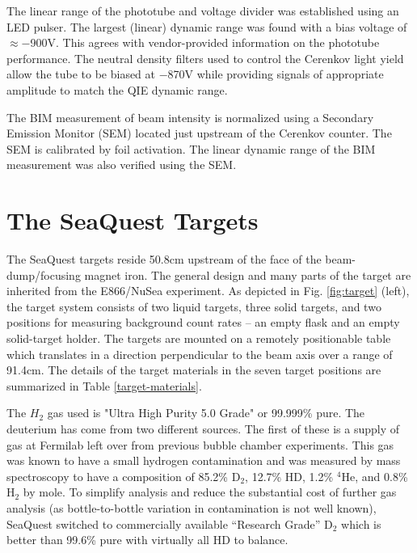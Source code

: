 The linear range of the phototube and voltage divider was established using an LED pulser.  The largest (linear) dynamic range was found with a bias voltage of $\approx-$900V.  This agrees with vendor-provided information on the phototube performance.  The neutral density filters used to control the Cerenkov light yield allow the tube to be biased at $-$870V while providing signals of appropriate amplitude to match the QIE dynamic range.

The BIM measurement of beam intensity is normalized using a Secondary Emission Monitor (SEM) located just upstream of the Cerenkov counter.  The SEM is calibrated by foil activation.  The linear dynamic range of the BIM measurement was also verified using the SEM.

\section{The SeaQuest Targets}



The SeaQuest targets reside 50.8cm upstream of the face of the beam-dump/focusing magnet iron.  The general design and many parts of the target
are inherited from the E866/NuSea experiment.   As depicted in Fig. \ref{fig:target} (left), the target system consists of two liquid targets, 
three solid targets, and two positions for measuring background count rates -- an empty flask and an empty solid-target holder.  The targets are
mounted on a remotely positionable table which translates in a direction perpendicular to the beam axis over a range of 91.4cm.
The details of the target materials in the seven target positions are summarized in Table \ref{target-materials}.

The $H_2$ gas used is "Ultra High Purity 5.0 Grade" or 99.999\% pure.  The deuterium has come from two different sources.  The first of these is a supply of gas at Fermilab left over from previous bubble chamber experiments.  This gas was known to have a small hydrogen contamination and was measured by mass spectroscopy to have a composition of 85.2\% D$_2$, 12.7\% HD, 1.2\% $^4$He, and 0.8\% H$_2$ by mole.  To simplify analysis and reduce the substantial cost of further gas analysis (as bottle-to-bottle variation in contamination is not well known), SeaQuest switched to commercially available ``Research Grade'' D$_2$ which is better than 99.6\% pure with virtually all HD to balance.

